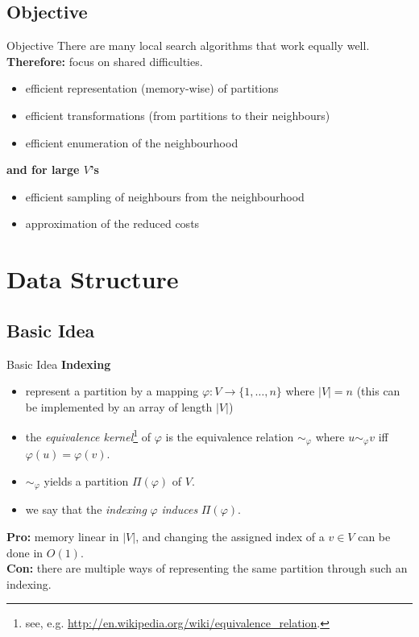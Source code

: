 \documentclass[10pt]{beamer}
\newcommand{\idx}{\varphi}
\begin{document}
\subsection*{Objective}
\begin{frame}{Objective}
    There are many local search algorithms that work equally well.
    \textbf{Therefore:} focus on shared difficulties.
    \begin{itemize}
        \item efficient representation (memory-wise) of partitions
        \item efficient transformations (from partitions to their neighbours)
        \item efficient enumeration of the neighbourhood
    \end{itemize}
    \textbf{and for large $V$'s}
    \begin{itemize}
        \item efficient sampling of neighbours from the neighbourhood
        \item approximation of the reduced costs
    \end{itemize}
\end{frame}

\section{Data Structure}
\subsection*{Basic Idea}
\begin{frame}{Basic Idea}
    \textbf{Indexing}
    \begin{itemize}
        \item represent a partition by a mapping $\idx: V \rightarrow \{ 1,\dots, n \}$ where $|V| = n$ (this can be implemented by an array of length $|V|$)
        \item the \emph{equivalence kernel}\footnote{see, e.g. \url{http://en.wikipedia.org/wiki/equivalence_relation}.} of $\idx$ is the equivalence relation $\sim_\idx$ where $u \sim_\idx v$ iff $\idx(u) = \idx(v)$.
        \item $\sim_\idx$ yields a partition $\Pi(\idx)$ of $V$.
        \item we say that the \emph{indexing} $\idx$ \emph{induces} $\Pi(\idx)$.
    \end{itemize}
    \pause
    \textbf{Pro:} memory linear in $|V|$, and changing the assigned index of a $v \in V$ can be done in $O(1)$. \\
    \textbf{Con:} there are multiple ways of representing the same partition through such an indexing.
\end{frame}
\end{document}
